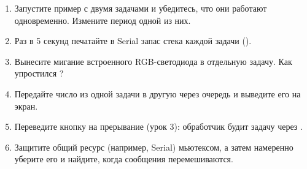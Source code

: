 \begin{tasks}
\begin{enumerate}
\item {} Запустите пример с двумя задачами и убедитесь, что они работают одновременно. Измените период одной из них.
\item {} Раз в 5 секунд печатайте в Serial запас стека каждой задачи ().
\item {} Вынесите мигание встроенного RGB-светодиода в отдельную задачу. Как упростился ?
\item {} Передайте число из одной задачи в другую через очередь и выведите его на экран.
\item {} Переведите кнопку на прерывание (урок 3): обработчик будит задачу через .
\item {} Защитите общий ресурс (например, Serial) мьютексом, а затем намеренно уберите его и найдите, когда сообщения перемешиваются.
\end{enumerate}
\end{tasks}
